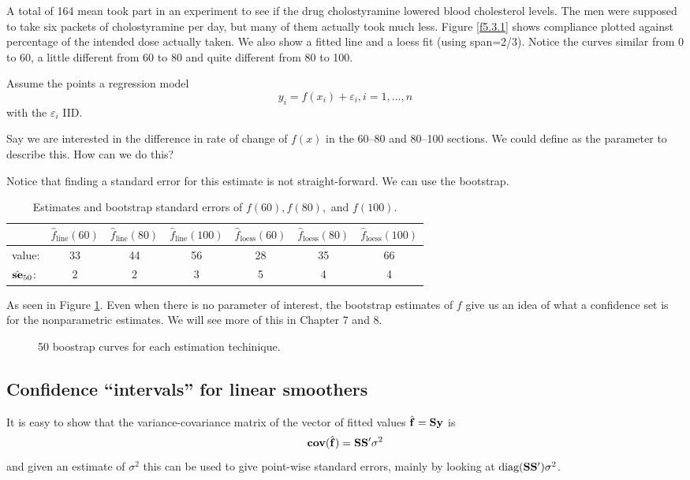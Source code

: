 A total of 164 mean took part in an experiment to see if the drug
cholostyramine lowered blood cholesterol levels. The men were supposed
to take six packets of cholostyramine per day, but many of them
actually took much less. Figure \ref{f5.3.1} shows compliance plotted
against percentage of the intended dose actually taken. We also show a
fitted line and a loess fit (using span=2/3). Notice the curves
similar from 0 to 60, a little different from 60 to 80 and quite
different from 80 to 100. 

Assume the points a regression model 
\[
y_i = f(x_i) + \varepsilon_i, i=1,\dots,n
\]
with the $\varepsilon_i$ IID. 

Say we are interested in the difference in rate of change of $f(x)$ in
the 60--80 and 80--100
sections. We could define as the parameter to describe this.
How can we do this?

Notice that finding a standard error for this estimate is not
straight-forward. We can use the bootstrap. 

\begin{table}[htb]
\caption{Estimates and bootstrap standard errors of $f(60), f(80),$
  and $f(100)$.}
\begin{tabular}{lcccccc}
 &$\hat{f}_{\mbox{line}}(60)$&$\hat{f}_{\mbox{line}}(80)$&$
 \hat{f}_{\mbox{line}}(100)$&$\hat{f}_{\mbox{loess}}(60)$&$
   \hat{f}_{\mbox{loess}}(80)$&$\hat{f}_{\mbox{loess}}(100)$\\
\hline
value:&33&44&56&28&35&66\\
$\hat{{\bf se}}_{50}$:&2&2&3&5&4&4
\end{tabular}
\end{table}

As seen in Figure \ref{f5.3.2}. Even when there is no parameter of interest, the bootstrap estimates
of $f$ give us an idea of what a confidence set is for the
nonparametric estimates. We will see more of this in Chapter 7 and 8.

\begin{figure}
\begin{center}
\end{center}
\caption{\label{f5.3.2} 50 boostrap curves for each estimation techinique.}
\end{figure}

\subsection{Confidence ``intervals'' for linear smoothers}
It is easy to show that the variance-covariance matrix of the vector
of fitted values $\hat{{\mathbf f}} = {\mathbf S} {\mathbf y}$ is
\[
{\bf cov}(\hat{{\mathbf f}}) = {\mathbf S} {\mathbf S}' \sigma^2
\]
and given an estimate of $\sigma^2$ this can be used to give
point-wise standard errors, mainly by looking at
$\mbox{diag}({\mathbf S}{\mathbf S}')\sigma^2$.  

